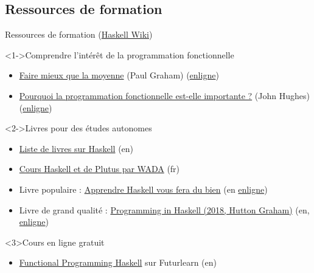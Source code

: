 \documentclass[presentation]{beamer}
\begin{document}
\subsection{Ressources de formation}
\label{sec:org3d6c17a}
\begin{frame}[label={sec:orgdd65eb3}]{Ressources de formation (\href{https://wiki.haskell.org/Haskell}{Haskell Wiki})}
\begin{block}<1->{Comprendre l'intérêt de la programmation fonctionnelle}
\begin{itemize}
\item \href{Ressources/beating\_average.pdf}{Faire mieux que la moyenne} (Paul Graham) (\href{https://franz.com/about/conferences/fds2001/presentations/pgtalk-rev2.pdf}{enligne})
\item \href{Ressources/why\_functionnal\_programming\_matter.pdf}{Pourquoi la programmation fonctionnelle est-elle importante ?} (John Hughes) (\href{https://www.cse.chalmers.se/\~rjmh/Papers/whyfp.pdf}{enligne})
\end{itemize}
\end{block}

\begin{block}<2->{Livres pour des études autonomes}
\begin{itemize}
\item \href{https://wiki.haskell.org/Books}{Liste de livres sur Haskell} (en)
\item \href{https://github.com/WADAlliance/Haskell\_Plutus\_Course}{Cours Haskell et de Plutus par WADA} (fr)
\item Livre populaire : \href{Ressources/learn\_you\_haskell\_for\_great\_good.pdf}{Apprendre Haskell vous fera du bien} (en \href{https://learnyouahaskell.github.io/chapters.html}{enligne})
\item Livre de grand qualité : \href{Ressources/Hutton\_G\_Programming\_in\_Haskell-Cambridge\_UP\_2018.pdf}{Programming in Haskell (2018, Hutton Graham)} (en, \href{https://www.cambridge.org/us/academic/subjects/computer-science/programming-languages-and-applied-logic/programming-haskell-2nd-edition}{enligne})
\end{itemize}
\end{block}
\begin{block}<3>{Cours en ligne gratuit}
\begin{itemize}
\item \href{https://www.futurelearn.com/courses/functional-programming-haskell}{Functional Programming Haskell} sur Futurlearn (en)
\end{itemize}
\end{block}
\end{frame}
\end{document}
